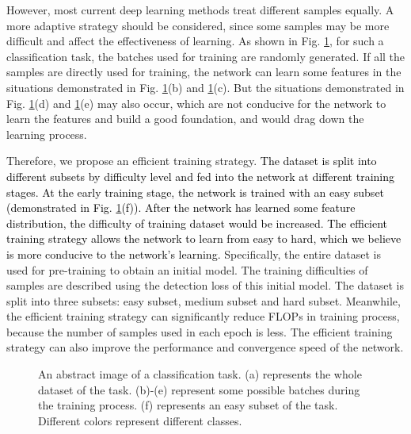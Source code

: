 \documentclass[lettersize,journal]{IEEEtran}
\newcommand{\editb}[1]{\textcolor{black}{#1}}
\begin{document}
However, most current deep learning methods treat different samples equally.
A more adaptive strategy should be considered, since some samples may be more difficult and affect the effectiveness of learning.
As shown in Fig. \ref{hierarchicalshow}, for such a classification task, the batches used for training are randomly generated.
If all the samples are directly used for training, the network can learn some features in the situations demonstrated in Fig. \ref{hierarchicalshow}(b) and \ref{hierarchicalshow}(c).
But the situations demonstrated in Fig. \ref{hierarchicalshow}(d) and \ref{hierarchicalshow}(e) may also occur, which are not conducive for the network to learn the features and build a good foundation, and would drag down the learning process.

Therefore, we propose an efficient training strategy.
\editb{The dataset is split into different subsets by difficulty level and fed into the network at different training stages.
At the early training stage, the network is trained with an easy subset (demonstrated in Fig. \ref{hierarchicalshow}(f)).
After the network has learned some feature distribution, the difficulty of training dataset would be increased.
The efficient training strategy allows the network to learn from easy to hard, which we believe is more conducive to the network's learning.}
Specifically, the entire dataset is used for pre-training to obtain an initial model.
The training difficulties of samples are described using the detection loss of this initial model.
The dataset is split into three subsets: easy subset, medium subset and hard subset.
Meanwhile, the efficient training strategy can significantly reduce FLOPs in training process, because the number of samples used in each epoch is less.
The efficient training strategy can also improve the performance and convergence speed of the network.

\begin{figure}[htb]
\centering
{}

\caption{An abstract image of a classification task.
(a) represents the whole dataset of the task.
(b)-(e) represent some possible batches during the training process.
(f) represents an easy subset of the task.
Different colors represent different classes.}
\label{hierarchicalshow}
\end{figure}
\end{document}
